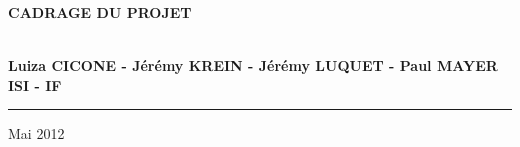 \documentclass[a4paper,11px]{article}
\begin{document}
\begin{titlepage}
\begin{center}
\begin{center}
{\Huge \bf CADRAGE DU PROJET}


\end{center}


\vspace{1cm}

\begin{center}
$ $\\
\large{ \textbf{Luiza CICONE - Jérémy KREIN - Jérémy LUQUET - Paul MAYER}}\\
\large{ \textbf{ISI - IF}}
$ $\\
\end{center}
\rule{\linewidth}{.5pt}


\vfill


{\large Mai 2012}

\end{center}
\end{titlepage}


\newpage


%
\newenvironment{myenumerate}{%
  \edef\backupindent{\the\parindent}%
  \enumerate%
  \setlength{\parindent}{\backupindent}%
}{\endenumerate}

%

\renewcommand{\appendixtocname}{Annexes}
\end{document}
